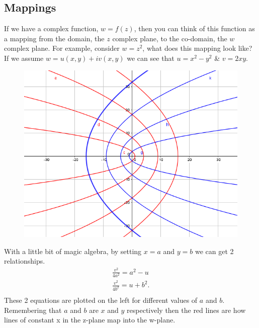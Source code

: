 \subsection{Mappings}
If we have a complex function, $w=f(z)$, then you can think of this function as a mapping from the domain, the $z$ complex plane, to the co-domain, the $w$ complex plane.
 For example, consider $w=z^2$, what does this mapping look like?
  If we assume $w=u(x,y)+iv(x,y)$ we can see that $u=x^2-y^2$ \& $v=2xy$.

\begin{minipage}[t]{0.47\linewidth}
	\begin{figure}[H]
		\centering
		\includegraphics[width=\linewidth]{complex/mapping}
		\captionsetup{font=small} 	
	\end{figure} 
\end{minipage}
\hspace{0.6cm}
%
\begin{minipage}[t]{0.47\linewidth}
	\vspace{0.3cm}
	With a little bit of magic algebra, by setting $x=a$ and $y=b$ we can get 2 relationships.
	\begin{align*}
	\frac{v^2}{4a^2}=a^2-u \\
	\frac{v^2}{4b^2}=u+b^2. \\
	\end{align*}
These 2 equations are plotted on the left for different values of $a$ and $b$.
 Remembering that $a$ and $b$ are $x$ and $y$ respectively then the red lines are how lines of constant x in the z-plane map into the w-plane.
\end{minipage}
